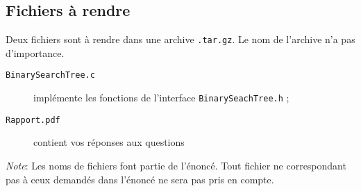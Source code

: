 \documentclass[a4paper,10pt]{article}
\begin{document}
\subsection*{Fichiers à rendre}
Deux fichiers sont à rendre dans une archive \texttt{.tar.gz}. Le nom de l'archive n'a pas d'importance.
\begin{description}
\item[\texttt{BinarySearchTree.c}] implémente les fonctions de l'interface \texttt{BinarySeachTree.h} ;
\item[\texttt{Rapport.pdf}] contient vos réponses aux questions
\end{description}

{\em Note}: Les noms de fichiers font partie de l'énoncé. Tout fichier ne
correspondant pas à ceux demandés dans l'énoncé ne sera pas pris en compte.
\end{document}
